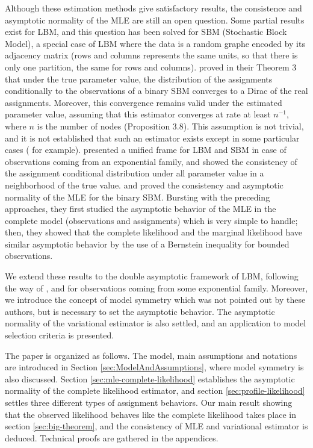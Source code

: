 \documentclass[bj]{imsart}
\numberwithin{equation}{section}
\theoremstyle{plain}
\theoremstyle{remark}
\begin{document}
Although these estimation methods give satisfactory results, the consistence and asymptotic normality of the MLE are still an open question. Some partial results exist for LBM, and this question has been solved for SBM (Stochastic Block Model), a special case of LBM where the data is a random graphe  encoded by its adjacency matrix (rows and columns represents the same units, so that there is only one partition, the same for rows and columns). \cite{celisse2012consistency} proved in their Theorem 3 that under the true parameter value, the distribution of the assignments conditionally to the observations of a binary SBM converges to a Dirac of the real assignments. Moreover, this convergence remains valid under the estimated parameter value, assuming that this estimator converges at rate at least $n^{-1}$, where $n$ is the number of nodes (Proposition 3.8). This assumption  is not trivial, and it is not established that such an estimator exists except in some particular cases (\cite{ambroise2012new} for example). \cite{mariadassou2015} presented a unified frame for LBM and SBM in case of observations coming from an exponential family, and showed the consistency of the  assignment conditional distribution under all parameter value in a neighborhood of the true value. \cite{bickel2009nonparametric} and \cite{bickel2013asymptotic} proved the consistency and asymptotic normality of the MLE for the binary SBM. Bursting with the preceding approaches, they first studied the asymptotic behavior of the MLE in the complete model (observations and assignments) which is very simple to handle; then, they showed that the complete likelihood and the marginal likelihood have similar asymptotic behavior by the use of a Bernstein inequality for bounded observations.

We extend these results to the double asymptotic framework of LBM, following the way of \cite{bickel2013asymptotic}, and for observations coming from some exponential family. Moreover, we introduce the concept of model symmetry  which was not pointed out by these authors, but is necessary to set the asymptotic behavior. The asymptotic normality of the variational estimator is also settled, and an application to model selection criteria is presented.

The paper is organized as follows. The model, main assumptions and notations are introduced in Section \ref {sec:ModelAndAssumptions}, where model symmetry is also discussed. Section \ref{sec:mle-complete-likelihood} establishes the asymptotic normality of the complete likelihood estimator, and section \ref{sec:profile-likelihood} settles three different types of assignment behaviors. Our main result showing that the observed likelihood behaves like the complete likelihood takes place in section \ref{sec:big-theorem}, and the consistency of MLE and variational estimator is deduced. 
Technical proofs are gathered in the appendices.
\end{document}
